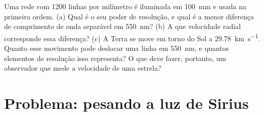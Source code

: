 \begin{exercise}[$\star\star\star$]\label{exo:b1:observing-the-sky:12}
Uma rede com 1200 linhas por milímetro é iluminada em \qty{100}{mm} e usada na primeira ordem. (a) Qual é o seu poder de resolução, e qual é a menor diferença de comprimento de onda separável em \qty{550}{nm}? (b) A que velocidade radial corresponde essa diferença? (c) A Terra se move em torno do Sol a \qty{29.78}{km.s^{-1}}. Quanto esse movimento pode deslocar uma linha em \qty{550}{nm}, e quantos elementos de resolução isso representa? O que deve fazer, portanto, um observador que mede a velocidade de uma estrela?
\end{exercise}

\section{Problema: pesando a luz de Sirius}

